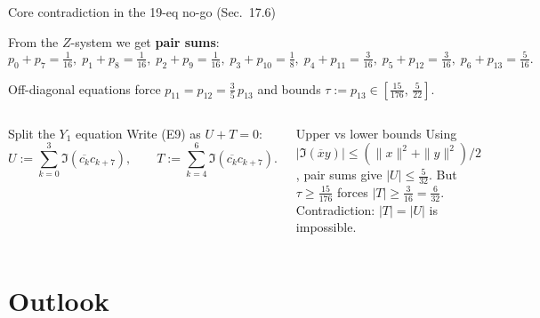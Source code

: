 \documentclass[aspectratio=169,t,10pt]{beamer}
\begin{document}
\begin{frame}{Core contradiction in the 19-eq no-go (Sec.~17.6)}

From the $Z$-system we get \textbf{pair sums}:
{\small
\[
p_0+p_7=\tfrac{1}{16},\;
p_1+p_8=\tfrac{1}{16},\;
p_2+p_9=\tfrac{1}{16},\;
p_3+p_{10}=\tfrac{1}{8},\;
p_4+p_{11}=\tfrac{3}{16},\;
p_5+p_{12}=\tfrac{3}{16},\;
p_6+p_{13}=\tfrac{5}{16}.
\]
}

Off-diagonal equations force $p_{11}=p_{12}=\tfrac35\,p_{13}$ and bounds
$\tau:=p_{13}\in[\tfrac{15}{176},\,\tfrac{5}{22}]$.

\begin{columns}[T]
\begin{block}{Split the $Y_1$ equation}
Write (E9) as $U+T=0$:
\[
U:=\sum_{k=0}^3 \Im(\overline{c_k}c_{k+7}),\qquad
T:=\sum_{k=4}^6 \Im(\overline{c_k}c_{k+7}).
\]
\end{block}

\begin{alertblock}{Upper vs lower bounds}
Using $|\Im(\overline{x}y)| \le (\|x\|^2+\|y\|^2)/2$, pair sums give $|U|\le \tfrac{5}{32}$.
But $\tau\ge \tfrac{15}{176}$ forces $|T|\ge \tfrac{3}{16}=\tfrac{6}{32}$.
Contradiction: $|T|=|U|$ is impossible.
\end{alertblock}
\end{columns}
\end{frame}

\section{Outlook}
\end{document}
